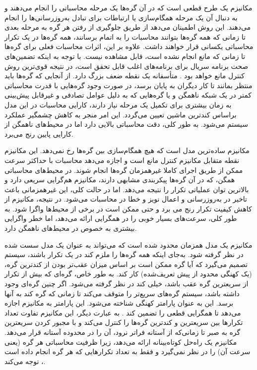 مکانیزم  یک طرح قطعی است که در آن گره‌ها یک مرحله محاسباتی را انجام می‌دهند و به دنبال آن یک مرحله همگام‌سازی یا ارتباطات برای تبادل به‌روزرسانی‌ها را انجام می‌دهند. این روش اطمینان می‌دهد از طریق جلوگیری از رفتن هر گره به مرحله بعدی تا زمانی که همه گره‌ها بتوانند محاسبات را به اتمام برسانند، همه گره‌ها در یک تکرار محاسباتی یکسانی قرار خواهند داشت. علاوه بر این، اثرات محاسبات فعلی برای گره‌ها تا زمانی که مانع انجام نشده است، قابل مشاهده نیست. با توجه به اینکه تضمین‌های صحت برنامه سریال برای برنامه‌های  اغلب قابل تحقق است، در نتیجه  قوی‌ترین روش کنترل مانع خواهد بود \cite{Ho2013}. متأسفانه  یک نقطه ضعف بزرگ دارد. از آنجایی که گره‌ها باید منتظر بمانند تا کار دیگران به پایان برسد، در صورت وجود گره‌هایی با قدرت محاسباتی کمتر در یک شبکه ناهمگن \cite{NIPS2012} و یا گره‌هایی که به دلیل عوامل تصادفی و غیرقابل پیش‌بینی به زمان بیشتری برای تکمیل یک مرحله نیاز دارند، کارایی محاسبات در این مدل براساس کندترین ماشین تعیین می‌گردد. این امر منجر به کاهش چشمگیر عملکرد سیستم می‌شود. به طور کلی،  دقت محاسباتی بالایی دارد اما در محیط‌های ناهمگن از کارایی پایین رنج می‌برد.

مکانیزم  ساده‌ترین مدل است که هیچ همگام‌سازی بین گره‌ها رخ نمی‌دهد. این مکانیزم نقطه متقابل مکانیزم کنترل مانع  است و اجازه می‌دهد محاسبات با حداکثر سرعت ممکن از طریق اجرای کاملا غیرهمزمان گره‌ها انجام شوند. در محیط‌های محاسباتی همگن، که در آن گره‌ها پیکربندی‌ مشابهی دارند، مکانیزم  هم‌گرایی سریعی دارد و بالاترین توان عملیاتی تکرار را نتیجه می‌دهد. اما در حالت کلی، این غیرهمزمانی باعث تاخیر در به‌روزرسانی و اعمال نویز و خطا در محاسبات می‌شود. در نتیجه، مکانیزم  از کاهش کیفیت تکرار رنج می برد و حتی ممکن است در برخی از محیط‌ها واگرا شود. به طور کلی،  سرعت‌های بسیار خوبی را در همگرایی ارائه می‌دهد، اما خطر واگرایی بیشتری به خصوص در محیط‌های ناهمگن دارد.

مکانیزم  یک مدل همزمان محدود شده است که می‌تواند به عنوان یک مدل  سست شده در نظر گرفته شود. به‌جای اینکه همه گره‌ها را ملزم کند در یک تکرار باشند، سیستم تصمیم می‌گیرد که آیا گره ممکن است بر اساس میزان عقب‌تر بودن از کندترین گره، (یک کهنگی محدود از پیش تعریف‌شده) کار کند. به طور خاص، گره‌ای که بیش از  تکرار از سریعترین گره عقب باشد، خیلی کند در نظر گرفته می‌شود. اگر چنین گره‌ای وجود داشته باشد، سیستم گره‌های سریع‌تر را متوقف می‌کند تا زمانی که گره کند به آنها برسد. این  به عنوان پارامتر کهنگی شناخته می‌شود. این پارامتر به مکانیزم  اجازه می‌دهد تا همگرایی قطعی را تضمین کند \cite{Ho2013}. به عبارت‌ دیگر، این مکانیزم تفاوت تعداد تکرارها بین سریعترین و کندترین گره‌ها را کنترل می‌کند و با مجبور کردن سریعترین گره به صبر تا زمانی‌که از آستانه فراتر نرود، آن را در محدوده آستانه قرار می‌دهد. مکانیزم  یک راه‌حل کوتاه‌بینانه ارائه می‌دهد، زیرا ظرفیت محاسباتی هر گره (یعنی سرعت آن) را در نظر نمی‌گیرد و فقط به تعداد تکرارهایی که هر گره انجام داده است ، توجه می‌کند.

